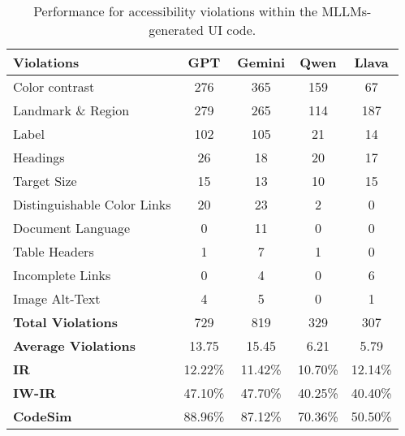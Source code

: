 \renewcommand{\arraystretch}{1.1}
\begin{table}
\tabcolsep=0.5cm
\centering
\small

\begin{tabular}{l|c|c|c|c} 
\hline
\rowcolor{lightgray} \textbf{Violations} & \textbf{GPT} & \textbf{Gemini} & \textbf{Qwen} & \textbf{Llava}  \\ 
\hline
Color contrast & 276 & 365 & 159 & 67 \\
\hline
Landmark \& Region & 279 & 265 & 114 & 187 \\
\hline
Label & 102 & 105 & 21 & 14 \\
\hline
Headings & 26 & 18 & 20 & 17 \\
\hline
Target Size & 15 & 13 & 10 & 15 \\
\hline
Distinguishable Color Links & 20 & 23 & 2 & 0 \\
\hline
Document Language & 0 & 11 & 0 & 0 \\
\hline
Table Headers & 1 & 7 & 1 & 0 \\
\hline
Incomplete Links & 0 & 4 & 0 & 6 \\
\hline
Image Alt-Text & 4 & 5 & 0 & 1 \\
\hline
\hline
\textbf{Total Violations} & 729 & 819 & 329 & 307 \\
\hline
\textbf{Average Violations} & 13.75 & 15.45 & 6.21 & 5.79 \\
\hline
\textbf{IR} & 12.22\% & 11.42\% & 10.70\% & 12.14\% \\
\hline
\textbf{IW-IR} & 47.10\% & 47.70\% & 40.25\% & 40.40\% \\
\hline
\textbf{CodeSim} & 88.96\% & 87.12\% & 70.36\% & 50.50\% \\
\hline
\end{tabular}
\caption{Performance for accessibility violations within the MLLMs-generated UI code.}
\label{tab:table-performance}
\end{table}